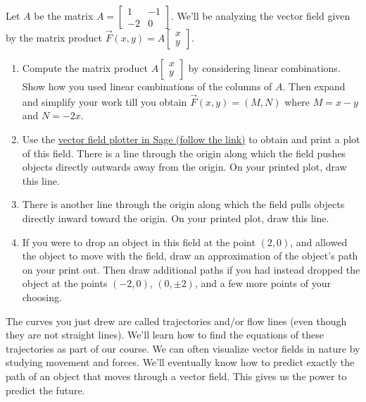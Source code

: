 \begin{problem}
Let $A$ be the matrix 
$A = 
\begin{bmatrix}
 1&-1\\-2&0
\end{bmatrix}.
$
We'll be analyzing the vector field given by the matrix product $\vec F(x,y) = A\begin{bmatrix}x\\y\end{bmatrix}$.
\begin{enumerate}
 \item Compute the matrix product $A\begin{bmatrix}x\\y\end{bmatrix}$ by considering linear combinations. Show how you used linear combinations of the columns of $A$.  Then expand and simplify your work till you obtain $\vec F(x,y) = (M,N)$ where $M=x-y$ and $N=-2x$.  
 \item 
Use the \href{\urlvectorfieldplotter}{vector field plotter in Sage (follow the link)} to obtain and print a plot of this field.  
There is a line through the origin along which the field pushes objects directly outwards away from the origin. 
On your printed plot, draw this line.
 \item 
There is another line through the origin along which the field pulls objects directly inward toward the origin. 
On your printed plot, draw this line.
 \item If you were to drop an object in this field at the point $(2,0)$, and allowed the object to move with the field, draw an approximation of the object's path on your print out.  Then draw additional paths if you had instead dropped the object at the points $(-2,0)$, $(0,\pm 2)$, and a few more points of your choosing. 

\end{enumerate}
\end{problem}

The curves you just drew are called trajectories and/or flow lines (even though they are not straight lines). We'll learn how to find the equations of these trajectories as part of our course. We can often visualize vector fields in nature by studying movement and forces.  We'll eventually know how to predict exactly the path of an object that moves through a vector field.  This gives us the power to predict the future.  




